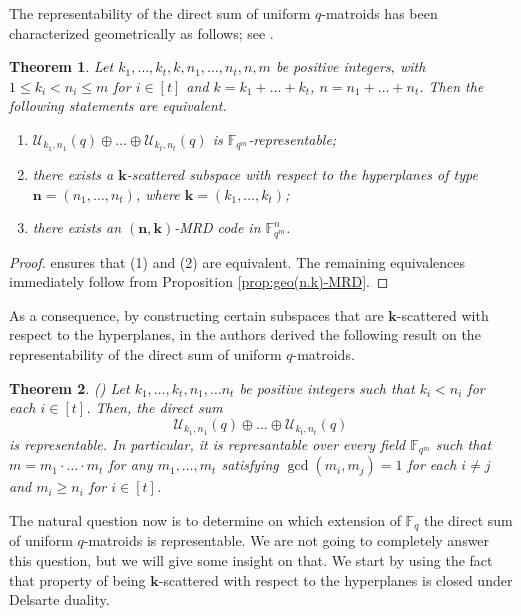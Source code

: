 \documentclass[11pt]{amsart}
\newtheorem{theorem}{Theorem}[section]
\newcommand{\mU}{\mathcal{U}}
\newcommand{\fqm}{\mathbb{F}_{q^m}}
\newcommand{\fq}{{\mathbb F}_{q}}
\newcommand{\Fm}{\mathbb{F}_{q^m}}
\begin{document}
The representability of the direct sum of uniform $q$-matroids has been characterized geometrically as follows; see \cite[Theorem 2.4]{alfarano2024representability}.

\begin{theorem}\label{thm:charact_independence}
Let $k_1,\ldots,k_t,k,n_1,\ldots,n_t, n, m$ be positive integers, with $1\le k_i< n_i\le m$ for $i \in [t]$ and $k=k_1+\ldots+k_t$, $n=n_1+\ldots+n_t$.
Then the following statements are equivalent.
\begin{enumerate}
    \item $\mU_{k_1,n_1}(q)\oplus\ldots\oplus\mU_{k_t,n_t}(q)$ is $\Fm$-representable;
    \item there exists a $\mathbf{k}$-scattered subspace with respect to the hyperplanes of type $\mathbf{n}=(n_1,\ldots,n_t)$, where $\mathbf{k}=(k_1,\ldots,k_t)$;
    \item there exists an $(\mathbf{n},\mathbf{k})$-MRD code in $\fqm^n$.
\end{enumerate}
\end{theorem}
\begin{proof}
    \cite[Theorem 2.4]{alfarano2024representability} ensures that (1) and (2) are equivalent. 
    The remaining equivalences immediately follow from Proposition \ref{prop:geo(n.k)-MRD}.
\end{proof}

As a consequence, by constructing certain subspaces that are $\mathbf{k}$-scattered with respect to the hyperplanes, in \cite{alfarano2024representability} the authors derived the following result on the representability of the direct sum of uniform $q$-matroids.

\begin{theorem}\label{thm:representability_direct_sum}(\cite[Theorem 3.2]{alfarano2024representability})
    Let $k_1,\ldots, k_t, n_1, \ldots n_t$ be positive integers such that $k_i< n_i$ for each $i \in [t]$. Then, the direct sum
    $$\mU_{k_1,n_1}(q) \oplus \ldots \oplus \mU_{k_t,n_t}(q)$$
    is representable. In particular, it is represantable over every field $\Fm$ such that $m=m_1\cdot\ldots\cdot m_t$ for any $m_1,\ldots,m_t$ satisfying $\gcd(m_i,m_j)=1$ for each $i \neq j$ and $m_i\geq n_i$ for $i\in [t]$.
\end{theorem}

The natural question now is to determine on which extension of $\fq$ the direct sum of uniform $q$-matroids is representable.
We are not going to completely answer this question, but we will give some insight on that.
We start by using the fact that property of being $\mathbf{k}$-scattered with respect to the hyperplanes is closed under Delsarte duality.
\end{document}
